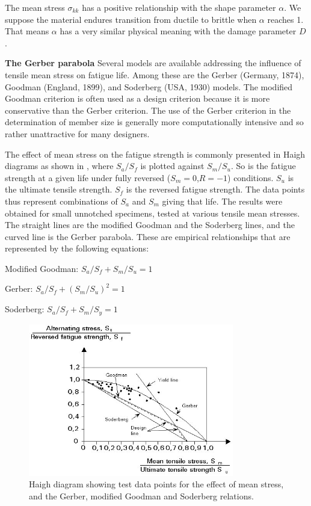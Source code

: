 The mean stress $\sigma_{kk}$ has a positive relationship with the shape parameter $\alpha$. We suppose the material endures transition from ductile to brittle when $\alpha$ reaches 1. That means $\alpha$ has a very similar physical meaning with the damage parameter $D$.

\textbf{The Gerber parabola}
Several models are available
addressing the influence of tensile mean stress on fatigue life. Among these are the Gerber (Germany, 1874), Goodman
(England, 1899), and Soderberg (USA, 1930) models.  The modified Goodman criterion is often used as a design criterion
because it is more conservative than the Gerber criterion. The use of the Gerber criterion in the determination of member size is generally more computationally  intensive and so rather unattractive for many designers.

The effect of mean stress on the fatigue strength is commonly presented in Haigh diagrams as shown in , where $S_a / S_f$ is plotted against $S_m / S_u$. So is the fatigue strength at a given life under fully reversed ($S_m = 0$,$R = -1$) conditions. $S_u$ is the ultimate tensile strength. $S_f$ is the reversed fatigue strength. The data points thus represent combinations of $S_a$ and $S_m$ giving that life. The results were obtained for small unnotched specimens, tested at various tensile mean stresses. The straight lines are the modified Goodman and the Soderberg lines, and the curved line is the Gerber parabola. These are empirical relationships that are represented by the following equations:

\vspace{6pt}
Modified Goodman: $S_a/S_f + S_m/S_u = 1$

\vspace{6pt}
Gerber: $S_a/ S_f + (S_m/ S_u)^2 = 1$

\vspace{6pt}
Soderberg: $S_a/S_f+S_m/S_y=1$

\begin{figure}[h!]
	\centering
	\includegraphics[width=0.8\textwidth]{figures//Gerber.png} 
	\caption{Haigh diagram showing test data points for the effect of mean stress, and the Gerber, modified Goodman and Soderberg relations.}
	\label{haigh}
\end{figure}

